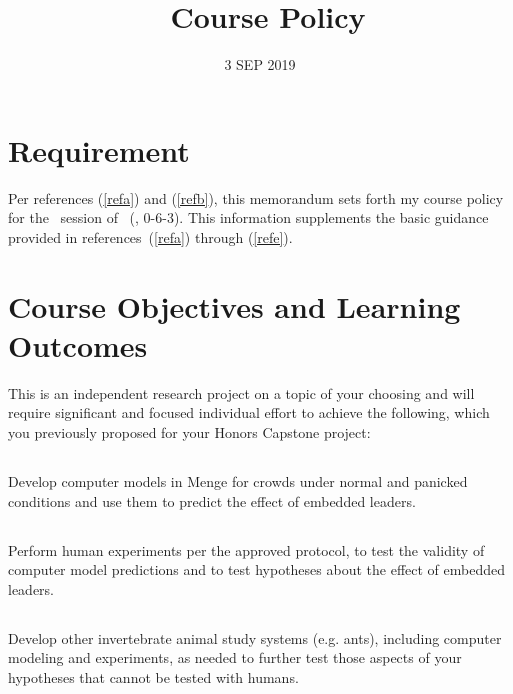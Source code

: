 \documentclass[10pt,courier]{navymemo}
\author{\usnaInstructorShort}
\title{\usnaCourseNumber\ Course Policy}
\date{3 SEP 2019}
\begin{document}
\makedateblock{}

\MEMORANDUM{}

\begin{navyletterheader}
\navyskip{}%

\navysubjline{}
\navyskip{}%
\end{navyletterheader}

\section{Requirement}
Per references (\ref{refa}) and (\ref{refb}), this memorandum sets forth my course policy for the \courseTerm\ session of \usnaCourseNumber\ (\usnaCourseName, 0-6-3).  This information supplements the basic guidance provided in references~(\ref{refa}) through (\ref{refe}). 

\section{Course Objectives and Learning Outcomes}  This is an independent research project on a topic of your choosing and will require significant and focused individual effort to achieve the following, which you previously proposed for your Honors Capstone project:
\subsection{} Develop computer models in Menge for crowds under normal and panicked conditions and use them to predict the effect of embedded leaders.
\subsection{} Perform human experiments per the approved protocol, to test the validity of computer model predictions and to test hypotheses about the effect of embedded leaders.
\subsection{} Develop other invertebrate animal study systems (e.g. ants), including computer modeling and experiments, as needed to further test those aspects of your hypotheses that cannot be tested with humans.  
\end{document}
